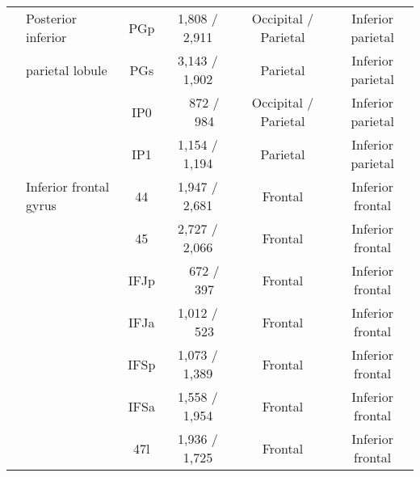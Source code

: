 \begin{table*}[t]
{\begin{tabular}{ l | l | c | c | c | c }
                                      \cmidrule{2-6}
                                      & Posterior inferior              & PGp                   & 1,808 / 2,911         & Occipital / Parietal  & Inferior parietal                         \\
                                      & parietal lobule                 & PGs                   & 3,143 / 1,902         & Parietal              & Inferior parietal                         \\
                                      &                                 & IP0                   & ~~872 / ~~984         & Occipital / Parietal  & Inferior parietal                         \\
                                      &                                 & IP1                   & 1,154 / 1,194         & Parietal              & Inferior parietal                         \\
                                      \cmidrule{2-6}
                                      & Inferior frontal gyrus          & 44                    & 1,947 / 2,681         & Frontal               & Inferior frontal                          \\
                                      &                                 & 45                    & 2,727 / 2,066         & Frontal               & Inferior frontal                          \\
                                      &                                 & IFJp                  & ~~672 / ~~397         & Frontal               & Inferior frontal                          \\
                                      &                                 & IFJa                  & 1,012 / ~~523         & Frontal               & Inferior frontal                          \\
                                      &                                 & IFSp                  & 1,073 / 1,389         & Frontal               & Inferior frontal                          \\
                                      &                                 & IFSa                  & 1,558 / 1,954         & Frontal               & Inferior frontal                          \\
                                      &                                 & 47l                   & 1,936 / 1,725         & Frontal               & Inferior frontal                          \\

\end{tabular}}
\end{table*}

